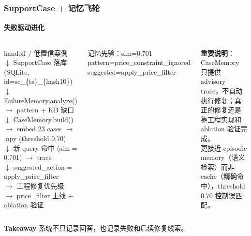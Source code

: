\documentclass[aspectratio=169,10pt]{beamer}
\newcommand{\takeaway}[1]{%
  \vfill%
  \begin{tcolorbox}[
    colback=Ctakebg, colframe=Ctakebg,
    arc=0pt, boxrule=0pt,
    left=7pt, right=7pt, top=4pt, bottom=4pt,
    width=\textwidth, nobeforeafter
  ]%
    {\scriptsize\color{white}\textbf{Takeaway}\enspace%
     \color{white!88!Ctakebg}#1}%
  \end{tcolorbox}%
}
\begin{document}
\begin{frame}
\frametitle{SupportCase + 记忆飞轮}
\framesubtitle{失败驱动进化}

\begin{columns}[T]
\begin{tcolorbox}[tcgray, title={\color{Ctextdark}飞轮流程}]
{\fontsize{7.5}{10}\selectfont\ttfamily\color{Ctextmain}
handoff / 低置信案例\\[0.15em]
\quad$\downarrow$ SupportCase 落库 (SQLite, id=sc\_\{ts\}\_\{hash10\})\\[0.1em]
\quad$\downarrow$ FailureMemory.analyze()\\
\quad\quad $\rightarrow$ pattern + KB 缺口\\[0.1em]
\quad$\downarrow$ CaseMemory.build()\\
\quad\quad $\rightarrow$ embed 23 cases $\rightarrow$ .npy (threshold 0.70)\\[0.1em]
\quad$\downarrow$ 新 query 命中 (sim = 0.701) $\rightarrow$ trace\\[0.1em]
\quad$\downarrow$ suggested\_action = apply\_price\_filter\\
\quad\quad $\rightarrow$ 工程修复优先级\\
\quad\quad $\rightarrow$ price\_filter 上线 + ablation 验证
}
\end{tcolorbox}

\begin{tcolorbox}[tcpurple, title={\color{purple!60}实测 trace 示例}]
{\fontsize{8}{10}\selectfont\ttfamily\color{purple!80!black}
记忆先验：sim=0.701\\
pattern=price\_constraint\_ignored\\
suggested=apply\_price\_filter
}
\end{tcolorbox}
\vspace{0.2cm}
\begin{tcolorbox}[tcblue]
\small
\textbf{重要说明}：CaseMemory 只提供 advisory trace，不自动执行修复；真正的修复还是靠工程实现和 ablation 验证完成。\\[0.2em]
更接近 episodic memory（语义检索）而非 cache（精确命中），threshold 0.70 控制误匹配。
\end{tcolorbox}
\end{columns}

\takeaway{系统不只记录回答，也记录失败和后续修复线索。}
\end{frame}
\end{document}
